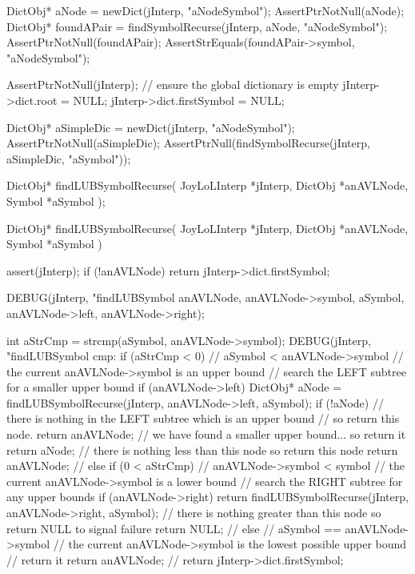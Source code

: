   DictObj* aNode = newDict(jInterp, "aNodeSymbol");
  AssertPtrNotNull(aNode);
  DictObj* foundAPair = findSymbolRecurse(jInterp, aNode, "aNodeSymbol");
  AssertPtrNotNull(foundAPair);
  AssertStrEquals(foundAPair->symbol, "aNodeSymbol");
\stopCTest
\stopTestCase

\startCTest
  AssertPtrNotNull(jInterp);
  // ensure the global dictionary is empty
  jInterp->dict.root        = NULL;
  jInterp->dict.firstSymbol = NULL;

  DictObj* aSimpleDic = newDict(jInterp, "aNodeSymbol");
  AssertPtrNotNull(aSimpleDic);
  AssertPtrNull(findSymbolRecurse(jInterp, aSimpleDic, "aSymbol"));
\stopCTest
\stopTestCase
\stopTestSuite

\startCHeader
DictObj* findLUBSymbolRecurse(
  JoyLoLInterp *jInterp,
  DictObj      *anAVLNode,
  Symbol       *aSymbol
);
\stopCHeader
{}

\startCCode
DictObj* findLUBSymbolRecurse(
  JoyLoLInterp *jInterp,
  DictObj      *anAVLNode,
  Symbol       *aSymbol
) {
  assert(jInterp);
  if (!anAVLNode) return jInterp->dict.firstSymbol;

  DEBUG(jInterp, "findLUBSymbol %
        anAVLNode, anAVLNode->symbol, aSymbol,
        anAVLNode->left, anAVLNode->right);

  int aStrCmp = strcmp(aSymbol, anAVLNode->symbol);
  DEBUG(jInterp, "findLUBSymbol cmp: %
  if (aStrCmp < 0) {
    // aSymbol < anAVLNode->symbol
    // the current anAVLNode->symbol is an upper bound
    // search the LEFT subtree for a smaller upper bound
    if (anAVLNode->left) {
      DictObj* aNode = findLUBSymbolRecurse(jInterp, anAVLNode->left, aSymbol);
      if (!aNode) {
        // there is nothing in the LEFT subtree which is an upper bound
        // so return this node.
        return anAVLNode;
      }
      // we have found a smaller upper bound... so return it
      return aNode;
    }
    // there is nothing less than this node so return this node
    return anAVLNode;
    //
  } else if (0 < aStrCmp) {
    // anAVLNode->symbol < symbol
    // the current anAVLNode->symbol is a lower bound
    // search the RIGHT subtree for any upper bounds
    if (anAVLNode->right) {
      return findLUBSymbolRecurse(jInterp, anAVLNode->right, aSymbol);
    }
    // there is nothing greater than this node so return NULL to signal failure
    return NULL;
    //
  } else {
    // aSymbol == anAVLNode->symbol
    // the current anAVLNode->symbol is the lowest possible upper bound
    // return it
    return anAVLNode;
    //
  }
  return jInterp->dict.firstSymbol;
}
\stopCCode


